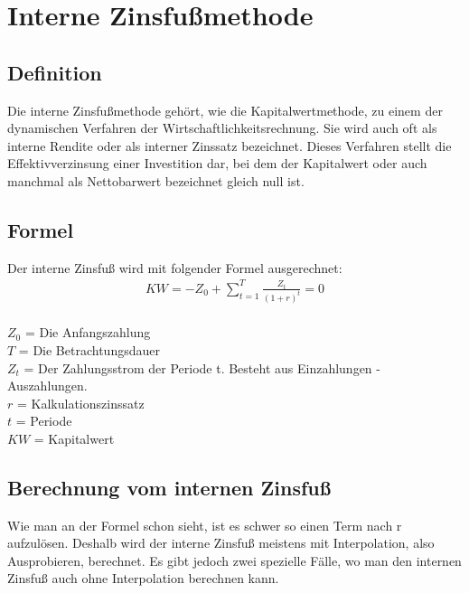 \chapter{Interne Zinsfußmethode}
\label{Interne Zinsfussmethode}
\section{Definition}
Die interne Zinsfußmethode gehört, wie die Kapitalwertmethode, zu einem der dynamischen Verfahren der Wirtschaftlichkeitsrechnung. Sie wird auch oft als interne Rendite oder als interner Zinssatz bezeichnet. Dieses Verfahren stellt die Effektivverzinsung einer Investition dar, bei dem der Kapitalwert oder auch manchmal als Nettobarwert bezeichnet gleich null ist.
\section{Formel}
Der interne Zinsfuß wird mit folgender Formel ausgerechnet:
\begin{align*}
    KW = -Z_{0} + \sum \limits_{t=1}^{T}{\frac{Z_{t}}{(1+r)^{t}}} = 0
\end{align*}
\\
$Z_0$ = Die Anfangszahlung \\
$T$  = Die Betrachtungsdauer\\
$Z_t$ = Der Zahlungsstrom der Periode t. Besteht aus Einzahlungen - Auszahlungen.\\
$r$ = Kalkulationszinssatz\\
$t$ = Periode\\
$KW$ = Kapitalwert
\newpage
\section{Berechnung vom internen Zinsfuß}
Wie man an der Formel schon sieht, ist es schwer so einen Term nach r aufzulösen. Deshalb wird der interne Zinsfuß meistens mit Interpolation, also Ausprobieren, berechnet. Es gibt jedoch zwei spezielle Fälle, wo man den internen Zinsfuß auch ohne Interpolation berechnen kann.
